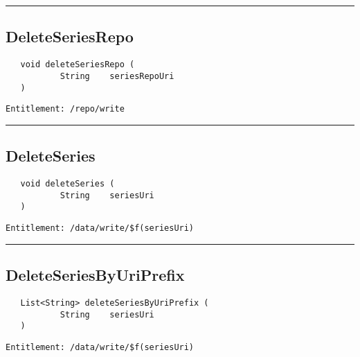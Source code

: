 \rule{12cm}{2pt}
\subsection{DeleteSeriesRepo}
\label{Api:DeleteSeriesRepo}
\begin{verbatim}
   void deleteSeriesRepo (
           String    seriesRepoUri
   )
\end{verbatim}
\begin{Verbatim}[fontsize=\small, formatcom=\color{Maroon}]
  Entitlement: /repo/write
\end{Verbatim}



\rule{12cm}{2pt}
\subsection{DeleteSeries}
\label{Api:DeleteSeries}
\begin{verbatim}
   void deleteSeries (
           String    seriesUri
   )
\end{verbatim}
\begin{Verbatim}[fontsize=\small, formatcom=\color{Maroon}]
  Entitlement: /data/write/$f(seriesUri)
\end{Verbatim}



\rule{12cm}{2pt}
\subsection{DeleteSeriesByUriPrefix}
\label{Api:DeleteSeriesByUriPrefix}
\begin{verbatim}
   List<String> deleteSeriesByUriPrefix (
           String    seriesUri
   )
\end{verbatim}
\begin{Verbatim}[fontsize=\small, formatcom=\color{Maroon}]
  Entitlement: /data/write/$f(seriesUri)
\end{Verbatim}



